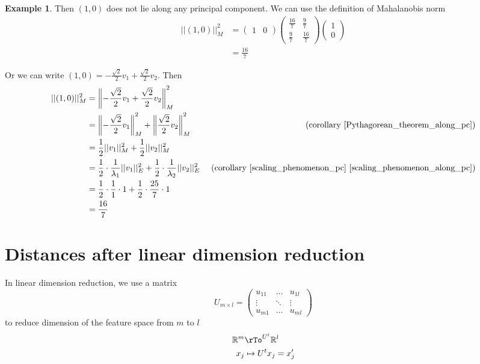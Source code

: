 \documentclass[11pt]{amsart}
\theoremstyle{definition}
\newtheorem{example}[theorem]{Example}
\begin{document}
\begin{example}
Then $(1, 0)$ does not lie along any principal component. We can use the definition of Mahalanobis norm
\begin{align*}
||(1, 0)||_M^2 & = \left( \begin{array}{cc} 1 & 0 \end{array} \right) \left( \begin{array}{cc} \frac{16}{7} & \frac{9}{7} \\ \frac{9}{7} & \frac{16}{7} \end{array} \right) \left( \begin{array}{c} 1 \\ 0 \end{array} \right) \\
 & = \frac{16}{7}
\end{align*}

Or we can write $(1, 0)  = - \frac{\sqrt{2}}{2} v_1 + \frac{\sqrt{2}}{2} v_2$. Then
\begin{align*}
||(1, 0)||_M^2 & = \left\Vert - \frac{\sqrt{2}}{2} v_1 + \frac{\sqrt{2}}{2} v_2 \right\Vert_M^2 & \\
 & = \left\Vert - \frac{\sqrt{2}}{2} v_1 \right\Vert_M^2 + \left\Vert \frac{\sqrt{2}}{2} v_2 \right\Vert_M^2 & \text{ (corollary \ref{Pythagorean_theorem_along_pc})} \\
 & = \frac{1}{2}||v_1||_M^2 + \frac{1}{2}||v_2||_M^2 & \\
 & = \frac{1}{2} \cdot \frac{1}{\lambda_1} ||v_1||^2_E + \frac{1}{2} \cdot \frac{1}{\lambda_2} ||v_2||^2_E & \text{ (corollary \ref{scaling_phenomenon_pc} \ref{scaling_phenomenon_along_pc})} \\
 & = \frac{1}{2} \cdot \frac{1}{1} \cdot 1 + \frac{1}{2} \cdot \frac{25}{7} \cdot 1 & \\
 & = \frac{16}{7} &
\end{align*}
\end{example}

\section{Distances after linear dimension reduction}
In linear dimension reduction, we use a matrix
$$U_{m \times l} = \left( \begin{array}{ccc} u_{11} & \dots & u_{1l} \\ \vdots & \ddots & \vdots \\ u_{m1} & \dots & u_{ml} \end{array} \right)$$
to reduce dimension of the feature space from $m$ to $l$
\begin{align*}
\mathbb{R}^m & \rTo^{U^t} \mathbb{R}^l \\
x_j & \mapsto U^t x_j = x_j'
\end{align*}
\end{document}
